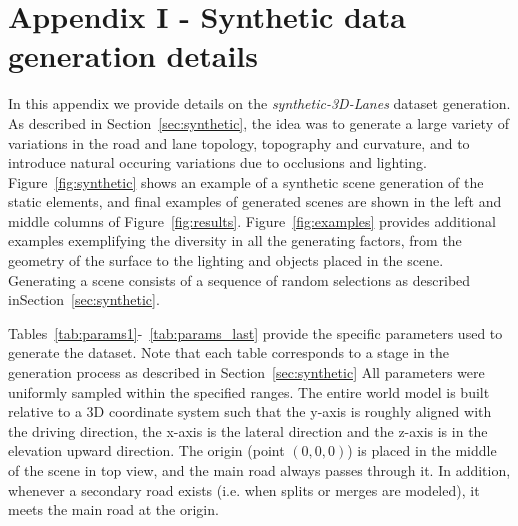 \documentclass[10pt,twocolumn,letterpaper]{article}
\begin{document}
\clearpage
\newpage

\section*{Appendix I - Synthetic data generation details}


In this appendix we provide details on the \textit{synthetic-3D-Lanes} dataset generation. As described in Section~\ref{sec:synthetic}, the idea was to generate a large variety of variations in the road and lane topology, topography and curvature, and to introduce natural occuring variations due to occlusions and lighting. Figure~\ref{fig:synthetic} shows an example of a synthetic scene generation of the static elements, and final examples of generated scenes are shown in the left and middle columns of Figure~\ref{fig:results}. Figure~\ref{fig:examples} provides additional examples exemplifying the diversity in all the generating factors, from the geometry of the surface to the lighting and objects placed in the scene. Generating a scene consists of a sequence of random selections as described inSection~\ref{sec:synthetic}.

Tables~\ref{tab:params1}-~\ref{tab:params_last} provide the specific parameters used to generate the dataset. Note that each table corresponds to a stage in the generation process as described in Section~\ref{sec:synthetic} All parameters were uniformly sampled within the specified ranges. The entire world model is built relative to a 3D coordinate system such that the y-axis is roughly aligned with the driving direction, the x-axis is the lateral direction and the z-axis is in the elevation upward direction. The origin (point $(0,0,0)$) is placed in the middle of the scene in top view, and the main road always passes through it. In addition, whenever a secondary road exists (i.e. when splits or merges are modeled), it meets the main road at the origin. 
\end{document}
